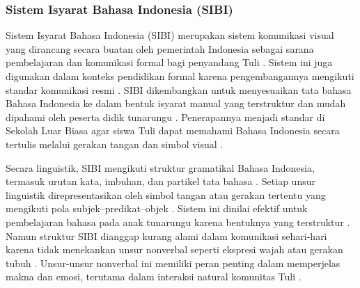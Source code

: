 
\subsubsection{Sistem Isyarat Bahasa Indonesia (SIBI)} \label{II.Teori1.1}
Sistem Isyarat Bahasa Indonesia (SIBI) merupakan sistem komunikasi visual yang dirancang secara buatan oleh pemerintah Indonesia sebagai sarana pembelajaran dan komunikasi formal bagi penyandang Tuli \cite{RakunSetyono2022}. Sistem ini juga digunakan dalam konteks pendidikan formal karena pengembangannya mengikuti standar komunikasi resmi \cite{RakunDarmana2022}. SIBI dikembangkan untuk menyesuaikan tata bahasa Bahasa Indonesia ke dalam bentuk isyarat manual yang terstruktur dan mudah dipahami oleh peserta didik tunarungu \cite{RakunDarmana2022}. Penerapannya menjadi standar di Sekolah Luar Biasa agar siswa Tuli dapat memahami Bahasa Indonesia secara tertulis melalui gerakan tangan dan simbol visual \cite{Zulpicha2017}.\par

Secara linguistik, SIBI mengikuti struktur gramatikal Bahasa Indonesia, termasuk urutan kata, imbuhan, dan partikel tata bahasa \cite{RakunSetyono2022}. Setiap unsur linguistik direpresentasikan oleh simbol tangan atau gerakan tertentu yang mengikuti pola subjek–predikat–objek \cite{Pratama2025}. Sistem ini dinilai efektif untuk pembelajaran bahasa pada anak tunarungu karena bentuknya yang terstruktur \cite{Zulpicha2017}. Namun struktur SIBI dianggap kurang alami dalam komunikasi sehari-hari karena tidak menekankan unsur nonverbal seperti ekspresi wajah atau gerakan tubuh \cite{RakunDarmana2022}. Unsur-unsur nonverbal ini memiliki peran penting dalam memperjelas makna dan emosi, terutama dalam interaksi natural komunitas Tuli \cite{Ratriyana2022}.\par


